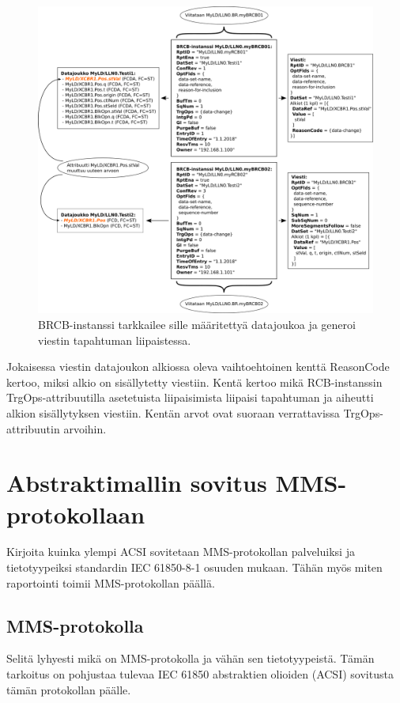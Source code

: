 \begin{figure}
	\includegraphics[width=1\textwidth]{pictures/iec61850-data-set-reporting.png}
	\caption{BRCB-instanssi tarkkailee sille määritettyä datajoukoa ja generoi viestin tapahtuman liipaistessa.}
	\label{fig:iec61850-data-set-reporting}
\end{figure}

Jokaisessa viestin datajoukon alkiossa oleva vaihtoehtoinen kenttä ReasonCode kertoo, miksi alkio on sisällytetty viestiin. Kentä kertoo mikä RCB-instanssin TrgOps-attribuutilla asetetuista liipaisimista liipaisi tapahtuman ja aiheutti alkion sisällytyksen viestiin. Kentän arvot ovat suoraan verrattavissa TrgOps-attribuutin arvoihin. \cite[s.~28--29]{IEC61850-7-2}


\section{Abstraktimallin sovitus MMS-protokollaan}
\begin{it}
	Kirjoita kuinka ylempi ACSI sovitetaan MMS-protokollan palveluiksi ja tietotyypeiksi standardin IEC 61850-8-1 osuuden mukaan. Tähän myös miten raportointi toimii MMS-protokollan päällä.
\end{it}


\subsection{MMS-protokolla}
\begin{it}
	Selitä lyhyesti mikä on MMS-protokolla ja vähän sen tietotyypeistä. Tämän tarkoitus on pohjustaa tulevaa IEC 61850 abstraktien olioiden (ACSI) sovitusta tämän protokollan päälle.
\end{it}


